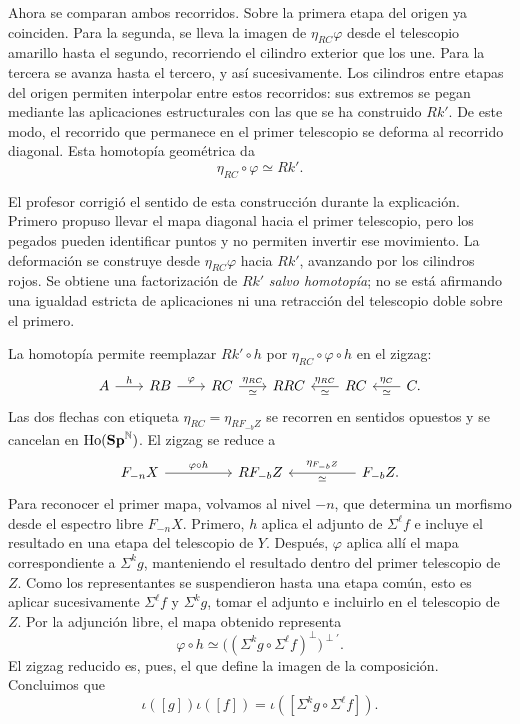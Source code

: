 Ahora se comparan ambos recorridos. Sobre la primera etapa del origen ya coinciden. Para la segunda, se lleva la imagen de $\eta_{RC}\varphi$ desde el telescopio amarillo hasta el segundo, recorriendo el cilindro exterior que los une. Para la tercera se avanza hasta el tercero, y así sucesivamente. Los cilindros entre etapas del origen permiten interpolar entre estos recorridos: sus extremos se pegan mediante las aplicaciones estructurales con las que se ha construido $Rk'$. De este modo, el recorrido que permanece en el primer telescopio se deforma al recorrido diagonal. Esta homotopía geométrica da
\[
\eta_{RC}\circ\varphi\simeq Rk'.
\]
\begin{nota}
El profesor corrigió el sentido de esta construcción durante la explicación. Primero propuso llevar el mapa diagonal hacia el primer telescopio, pero los pegados pueden identificar puntos y no permiten invertir ese movimiento. La deformación se construye desde $\eta_{RC}\varphi$ hacia $Rk'$, avanzando por los cilindros rojos. Se obtiene una factorización de $Rk'$ \emph{salvo homotopía}; no se está afirmando una igualdad estricta de aplicaciones ni una retracción del telescopio doble sobre el primero.
\end{nota}
La homotopía permite reemplazar $Rk'\circ h$ por $\eta_{RC}\circ\varphi\circ h$ en el zigzag:
\[
\begin{tikzcd}[column sep=2em]
A\arrow[r,"h"]&RB\arrow[r,"\varphi"]&RC\arrow[r,"\eta_{RC}","\simeq"']&RRC&RC\arrow[l,"\eta_{RC}"',"\simeq"]&C\arrow[l,"\eta_C"',"\simeq"] .
\end{tikzcd}
\]
Las dos flechas con etiqueta $\eta_{RC}=\eta_{RF_{-b}Z}$ se recorren en sentidos opuestos y se cancelan en $\operatorname{Ho}(\mathbf{Sp}^{\mathbb N})$. El zigzag se reduce a
\[
\begin{tikzcd}[column sep=huge]
F_{-n}X\arrow[r,"\varphi\circ h"]&RF_{-b}Z&F_{-b}Z\arrow[l,"\eta_{F_{-b}Z}"',"\simeq"] .
\end{tikzcd}
\]
Para reconocer el primer mapa, volvamos al nivel $-n$, que determina un morfismo desde el espectro libre $F_{-n}X$. Primero, $h$ aplica el adjunto de $\Sigma^\ell f$ e incluye el resultado en una etapa del telescopio de $Y$. Después, $\varphi$ aplica allí el mapa correspondiente a $\Sigma^kg$, manteniendo el resultado dentro del primer telescopio de $Z$. Como los representantes se suspendieron hasta una etapa común, esto es aplicar sucesivamente $\Sigma^\ell f$ y $\Sigma^kg$, tomar el adjunto e incluirlo en el telescopio de $Z$. Por la adjunción libre, el mapa obtenido representa
\[
\varphi\circ h\simeq
\bigl((\Sigma^kg\circ\Sigma^\ell f)^\perp\bigr)^{\perp'}.
\]
El zigzag reducido es, pues, el que define la imagen de la composición. Concluimos que
\[
\iota([g])\iota([f])=\iota([\Sigma^kg\circ\Sigma^\ell f]).
\]

